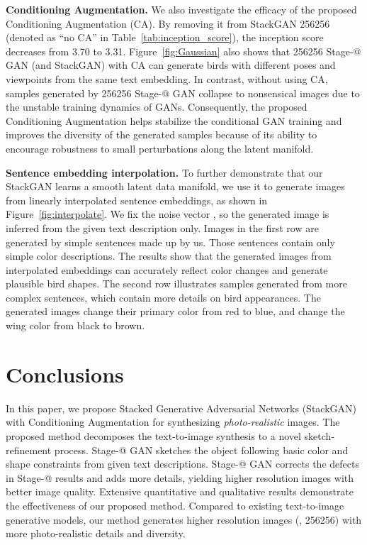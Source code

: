 \documentclass[10pt,twocolumn,letterpaper]{article}
\makeatletter
\newcommand{\Rmnum}[1]{\expandafter\@slowromancap\romannumeral #1@}
\makeatother
\begin{document}
\textbf{Conditioning Augmentation.} 
We also investigate the efficacy of the proposed Conditioning Augmentation (CA). By removing it from StackGAN 256256 (denoted as ``no CA'' in Table~\ref{tab:inception_score}), the inception score decreases from 3.70 to 3.31. Figure~\ref{fig:Gaussian} also shows that 256256 Stage-\Rmnum{1} GAN (and StackGAN) with CA can generate birds with different poses and viewpoints from the same text embedding. In contrast, without using CA, samples generated by 256256 Stage-\Rmnum{1} GAN collapse to nonsensical images due to the unstable training dynamics of GANs. Consequently, the proposed Conditioning Augmentation helps stabilize the conditional GAN training and improves the diversity of the generated samples because of its ability to encourage robustness to small perturbations along the latent manifold. 



\textbf{Sentence embedding interpolation. }
To further demonstrate that our StackGAN learns a smooth latent data manifold, we use it to generate images from linearly interpolated sentence embeddings, as shown in Figure~\ref{fig:interpolate}. We fix the noise vector , so the generated image is inferred from the given text description only. Images in the first row are generated by simple sentences made up by us. Those sentences contain only simple color descriptions. The results show that the generated images from interpolated embeddings can accurately reflect color changes and generate plausible bird shapes. The second row illustrates samples generated from more complex sentences, which contain more details on bird appearances. The generated images change their primary color from red to blue, and change the wing color from black to brown.


\vspace{-5pt}
\section{Conclusions}
\vspace{-5pt}

In this paper, we propose Stacked Generative Adversarial Networks (StackGAN) with Conditioning Augmentation for synthesizing \emph{photo-realistic} images. The proposed method decomposes the text-to-image synthesis to a novel sketch-refinement process. Stage-\Rmnum{1} GAN sketches the object following basic color and shape constraints from given text descriptions. Stage-\Rmnum{2} GAN corrects the defects in Stage-\Rmnum{1} results and adds more details, yielding higher resolution images with better image quality. Extensive quantitative and qualitative results demonstrate the effectiveness of our proposed method. Compared to existing text-to-image generative models, our method generates higher resolution images (\eg, 256256) with more photo-realistic details and diversity. 
\end{document}
